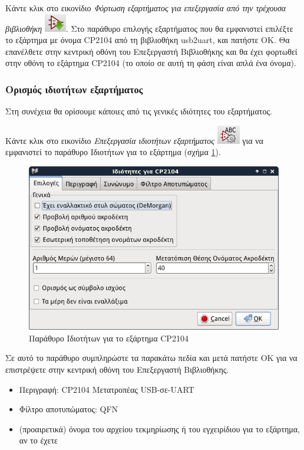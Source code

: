 \documentclass[a4paper]{article}
\begin{document}
Κάντε κλικ στο εικονίδιο \textit{Φόρτωση εξαρτήματος για επεξεργασία από την τρέχουσα βιβλιοθήκη} \includegraphics[scale=.5]{img/libed-ico-loadcomp.png}. Στο παράθυρο επιλογής εξαρτήματος που θα εμφανιστεί επιλέξτε το εξάρτημα με όνομα CP2104 από τη βιβλιοθήκη usb2uart, και πατήστε ΟΚ. Θα επανέλθετε στην κεντρική οθόνη του Επεξεργαστή Βιβλιοθήκης και θα έχει φορτωθεί στην οθόνη το εξάρτημα CP2104 (το οποίο σε αυτή τη φάση είναι απλά ένα όνομα).

\subsubsection{Ορισμός ιδιοτήτων εξαρτήματος}

Στη συνέχεια θα ορίσουμε κάποιες από τις γενικές ιδιότητες του εξαρτήματος. 

Κάντε κλικ στο εικονίδιο \textit{Επεξεργασία ιδιοτήτων εξαρτήματος} \includegraphics[scale=.5]{img/libed-ico-compprop.png} 
για να εμφανιστεί το παράθυρο Ιδιοτήτων για το εξάρτημα (σχήμα \ref{fig:libed-dial-compprop}). 

\begin{figure}
  \begin{center}
    \includegraphics[width=.5\textwidth]{img/libed-dial-compprop.png}
    \caption{Παράθυρο Ιδιοτήτων για το εξάρτημα CP2104}
    \label{fig:libed-dial-compprop}
  \end{center}
\end{figure}

Σε αυτό το παράθυρο συμπληρώστε τα παρακάτω πεδία και μετά πατήστε ΟΚ για να επιστρέψετε στην κεντρική οθόνη του Επεξεργαστή Βιβλιοθήκης.

\begin{itemize}
    \item Περιγραφή: CP2104 Μετατροπέας USB-σε-UART
    \item Φίλτρο αποτυπώματος: QFN
    \item (προαιρετικά) όνομα του αρχείου τεκμηρίωσης ή του εγχειρίδιου για το εξάρτημα, αν το έχετε
\end{itemize}
\end{document}
